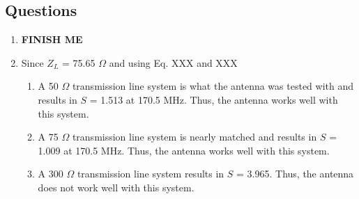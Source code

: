 \documentclass{article}
\begin{document}
\subsection{Questions}
\begin{enumerate}
	\item \textbf{FINISH ME}
	
	\item Since $Z_L$ = 75.65 $\Omega$ and using Eq. XXX and XXX
	\begin{enumerate}
		\item A 50 $\Omega$ transmission line system is what the antenna was tested with and results in $S$ = 1.513 at 170.5 MHz. Thus, the antenna works well with this system.
		\item A 75 $\Omega$ transmission line system is nearly matched and results in $S$ = 1.009 at 170.5 MHz. Thus, the antenna works well with this system.
		\item A 300 $\Omega$ transmission line system results in $S$ = 3.965. Thus, the antenna does not work well with this system.
	\end{enumerate}
\end{enumerate}
\end{document}
